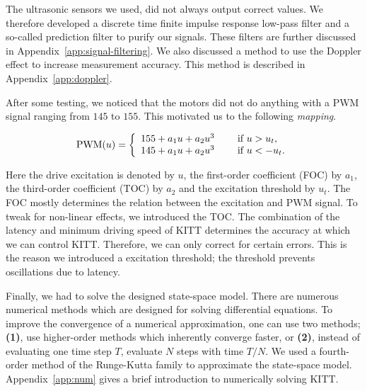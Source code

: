 \documentclass[11pt,titlepage]{report}
\begin{document}
The ultrasonic sensors we used, did not always output correct values. We therefore developed a discrete time finite impulse response low-pass filter and a so-called prediction filter to purify our signals. These filters are further discussed in Appendix~\ref{app:signal-filtering}. We also discussed a method to use the Doppler effect to increase measurement accuracy. This method is described in Appendix~\ref{app:doppler}.

After some testing, we noticed that the motors did not do anything with a PWM signal ranging from $145$ to $155$. This motivated us to the following \textit{mapping}.

\begin{equation} \label{eq:ctrl-mapping}
	\text{PWM}(u) = \left\{ \begin{array}{l l}
		155 + a_1 u + a_2 u^3 & \quad \text{ if } u > u_t, \\
		145 + a_1 u + a_2 u^3 & \quad \text{ if } u < -u_t.
	\end{array} \right.
\end{equation}

Here the drive excitation is denoted by $u$, the first-order coefficient (FOC) by $a_1$, the third-order coefficient (TOC) by $a_2$ and the excitation threshold by $u_t$. The FOC mostly determines the relation between the excitation and PWM signal. To tweak for non-linear effects, we introduced the TOC. The combination of the latency and minimum driving speed of KITT determines the accuracy at which we can control KITT. Therefore, we can only correct for certain errors. This is the reason we introduced a excitation threshold; the threshold prevents oscillations due to latency.

Finally, we had to solve the designed state-space model. There are numerous numerical methods which are designed for solving differential equations. To improve the convergence of a numerical approximation, one can use two methods; \textbf{(1)}, use higher-order methods which inherently converge faster, or \textbf{(2)}, instead of evaluating one time step $T$, evaluate $N$ steps with time $T/N$. We used a fourth-order method of the Runge-Kutta family to approximate the state-space model. Appendix~\ref{app:num} gives a brief introduction to numerically solving KITT.
\end{document}
